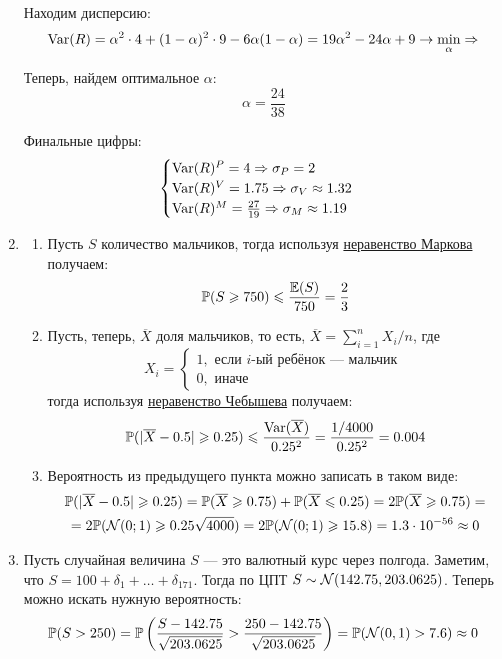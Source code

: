\begin{enumerate}
Находим дисперсию:
\[
\operatorname{Var}(R) = \alpha^2 \cdot 4 + (1-\alpha)^2 \cdot 9 - 6\alpha (1-\alpha) = 19\alpha^2 -24\alpha + 9 \to \min_{\alpha} \Rightarrow
\]

Теперь, найдем оптимальное $\alpha$:
\[
\alpha = \frac{24}{38}
\]

Финальные цифры:
\[
\begin{cases}
\operatorname{Var}(R)^{P} = 4 \Rightarrow \sigma_{P} = 2 \\
\operatorname{Var}(R)^{V} = 1.75 \Rightarrow \sigma_{V} \approx 1.32 \\
\operatorname{Var}(R)^{M} = \frac{27}{19} \Rightarrow \sigma_{M} \approx 1.19 \\
\end{cases}
\]
\item
\begin{enumerate}
\item Пусть $S$ количество мальчиков, тогда используя \href{https://en.wikipedia.org/wiki/Markov%27s_inequality}{неравенство Маркова} получаем:
\[
\mathbb{P}(S \geqslant 750) \leqslant \frac{\mathbb{E}(S)}{750} = \frac{2}{3}
\]
\item Пусть, теперь, $\overline{X}$ доля мальчиков, то есть, $\overline{X} = \sum_{i=1}^n X_i /n$, где
\[
X_i =
\begin{cases}
1, \text{ если }i\text{-ый ребёнок — мальчик }\\
0, \text{ иначе }
\end{cases}
\]
тогда используя \href{https://en.wikipedia.org/wiki/Markov%27s_inequality}{неравенство Чебышева} получаем:
\[
\mathbb{P}(|\overline{X} - 0.5| \geqslant 0.25) \leqslant \frac{\operatorname{Var}(\overline{X})}{0.25^2} = \frac{1/4000}{0.25^2} = 0.004
\]
\item Вероятность из предыдущего пункта можно записать в таком виде:
\begin{multline*}
\mathbb{P}(|\overline{X} - 0.5| \geqslant 0.25) = \mathbb{P}(\overline{X} \geqslant 0.75) + \mathbb{P}(\overline{X} \leqslant 0.25) = 2\mathbb{P}(\overline{X} \geqslant 0.75)=\\
= 2\mathbb{P}(\mathcal{N}(0;1)\geqslant 0.25\sqrt{4000})=2\mathbb{P}(\mathcal{N}(0;1)\geqslant 15.8) = 1.3 \cdot 10^{-56} \approx 0
\end{multline*}
\end{enumerate}
\item Пусть случайная величина $S$ —  это валютный курс через полгода. Заметим, что $S = 100 + \delta_1 + \ldots + \delta_{171}$.
Тогда по ЦПТ $S \sim \mathcal{N}(142.75, 203.0625)$. Теперь можно искать нужную вероятность:
\[
\mathbb{P}(S > 250) = \mathbb{P} \left(\frac{S -  142.75}{\sqrt{203.0625}} > \frac{250-142.75}{\sqrt{203.0625}} \right) = \mathbb{P}(\mathcal{N}(0, 1) > 7.6) \approx 0
\]
\end{enumerate}




